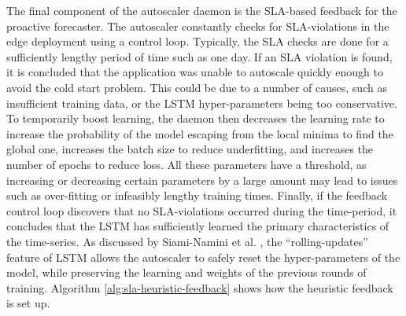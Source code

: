 The final component of the autoscaler daemon is the SLA-based feedback for the proactive forecaster. The autoscaler constantly checks for SLA-violations in the edge deployment using a control loop. Typically, the SLA checks are done for a sufficiently lengthy period of time such as one day. If an SLA violation is found, it is concluded that the application was unable to autoscale quickly enough to avoid the cold start problem. This could be due to a number of causes, such as insufficient training data, or the LSTM hyper-parameters being too conservative. To temporarily boost learning, the daemon then decreases the learning rate to increase the probability of the model escaping from the local minima to find the global one, increases the batch size to reduce underfitting, and increases the number of epochs to reduce loss. All these parameters have a threshold, as increasing or decreasing certain parameters by a large amount may lead to issues such as over-fitting or infeasibly lengthy training times. Finally, if the feedback control loop discovers that no SLA-violations occurred during the time-period, it concludes that the LSTM has sufficiently learned the primary characteristics of the time-series. As discussed by Siami-Namini et al. \cite{siami2018comparison}, the ``rolling-updates'' feature of LSTM allows the autoscaler to safely reset the hyper-parameters of the model, while preserving the learning and weights of the previous rounds of training. Algorithm \ref{alg:sla-heuristic-feedback} shows how the heuristic feedback is set up.\par